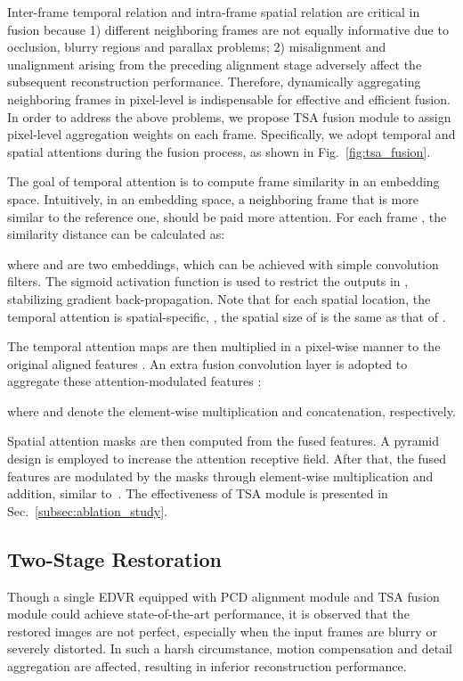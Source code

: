 \documentclass[10pt,twocolumn,letterpaper]{article}
\begin{document}
Inter-frame temporal relation and intra-frame spatial relation are critical in fusion because 1) different neighboring frames are not equally informative due to occlusion, blurry regions and parallax problems; 2) misalignment and unalignment arising from the preceding alignment stage adversely affect the subsequent reconstruction performance. 
Therefore, dynamically aggregating neighboring frames in pixel-level is indispensable for effective and efficient fusion.
In order to address the above problems, we propose TSA fusion module to assign pixel-level aggregation weights on each frame. Specifically, we adopt temporal and spatial attentions during the fusion process, as shown in Fig.~\ref{fig:tsa_fusion}.

The goal of temporal attention is to compute frame similarity in an embedding space.
Intuitively, in an embedding space, a neighboring frame that is more similar to the reference one, should be paid more attention.
For each frame , the similarity distance  can be calculated as:
\vspace{-0.1cm}

where  and  are two embeddings, which can be achieved with simple convolution filters. The sigmoid activation function is used to restrict the outputs in , stabilizing gradient back-propagation.
Note that for each spatial location, the temporal attention is spatial-specific, \ie, the spatial size of  is the same as that of .

The temporal attention maps are then multiplied in a pixel-wise manner to the original aligned features . An extra fusion convolution layer is adopted to aggregate these attention-modulated features :
\vspace{-0.1cm}


where  and  denote the element-wise multiplication and concatenation, respectively.

Spatial attention masks are then computed from the fused features. A pyramid design is employed to increase the attention receptive field.
After that, the fused features are modulated by the masks through element-wise multiplication and addition, similar to~\cite{wang2018recovering}. 
The effectiveness of TSA module is presented in Sec.~\ref{subsec:ablation_study}.

\subsection{Two-Stage Restoration}
\label{subsec:twostage}
\vspace{-0.2cm}
Though a single EDVR equipped with PCD alignment module and TSA fusion module could achieve state-of-the-art performance, it is observed that the restored images are not perfect, especially when the input frames are blurry or severely distorted. 
In such a harsh circumstance, motion compensation and detail aggregation are affected, resulting in inferior reconstruction performance. 
\end{document}
